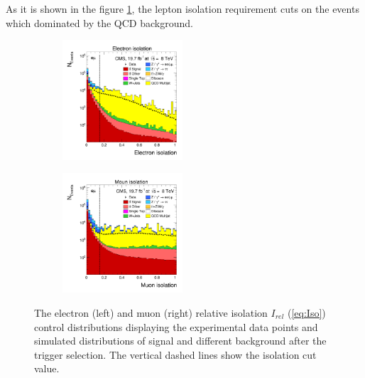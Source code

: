\begin{itemize}
 As it is shown in the figure \ref{fig:PFIso}, the lepton isolation requirement cuts on the events which dominated by the QCD background.

 \begin{figure}[h]
 \centering
 \begin{subfigure}
   \centering
   \includegraphics[width=0.49\textwidth]{04_event_reconstruction/plots/PF_e_Iso.png}
 \end{subfigure}
 \begin{subfigure}
   \centering
   \includegraphics[width=0.49\textwidth]{04_event_reconstruction/plots/PF_mu_Iso.png}
 \end{subfigure}
 \caption{The electron (left) and muon (right) relative isolation $I_{rel}$ (\ref{eq:Iso}) control distributions displaying the experimental data points
 and simulated distributions of signal and different background after the trigger selection. The vertical dashed lines show the isolation cut value.}
 \label{fig:PFIso}
 \end{figure}
 

\end{itemize}
